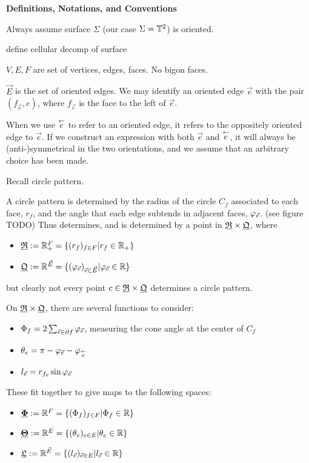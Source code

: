 \textbf{Definitions, Notations, and Conventions}

Always assume surface $\Sigma$ (our case $\Sigma = {\mathbb{T}^2}$) is oriented.

define cellular decomp of surface

$V,E,F$ are set of vertices, edges, faces.
No bigon faces.

$\vec{E}$ is the set of oriented edges.
We may identify an oriented edge $\vec{e}$ with the pair $(f_{\vec{e}}, e)$,
where $f_{\vec{e}}$ is the face to the left of $\vec{e}$.

When we use $\overset{\leftarrow}{e}$ to refer to an oriented edge, it refers to
the oppositely oriented edge to $\vec{e}$.
If we construct an expression with both $\vec{e}$ and $\overset{\leftarrow}{e}$,
it will always be (anti-)symmetrical in the two orientations,
and we assume that an arbitrary choice has been made.



Recall circle pattern.

A circle pattern is determined by the radius of the circle $C_f$ associated to each face, $r_f$,
and the angle that each edge subtends in adjacent faces, $\varphi_{\vec{e}}$. (see figure TODO)
Thus determines, and is determined by a point in ${\underline{\mathfrak{R}}} \times {\underline{\mathfrak{Q}}}$, where

\begin{itemize}
	\item ${\underline{\mathfrak{R}}} := \mathbb{R}_+^F = \{(r_f)_{f\in F} | r_f \in \mathbb{R}_+\}$
	\item ${\underline{\mathfrak{Q}}} := \mathbb{R}^{\vec{E}} =
		\{(\varphi_{\vec{e}})_{\vec{e} \in \vec{E}} | \varphi_{\vec{e}} \in \mathbb{R}\}$
\end{itemize}
but clearly not every point $c\in {\underline{\mathfrak{R}}} \times {\underline{\mathfrak{Q}}}$ determines a circle pattern.


On ${\underline{\mathfrak{R}}} \times {\underline{\mathfrak{Q}}}$, there are several functions to consider:
\begin{itemize}
	\item $\Phi_f = 2 \sum_{\vec{e} \in \partial f} \varphi_{\vec{e}}$, measuring the cone angle
		at the center of $C_f$
	\item $\theta_e = \pi - \varphi_{\vec{e}} - \varphi_{\overset{\leftarrow}{e}}$
	\item $l_{\vec{e}} = r_{f_{\vec{e}}} \sin \varphi_{\vec{e}}$
\end{itemize}

These fit together to give maps to the following spaces:

\begin{itemize}
	\item ${\underline{\mathbf{\Phi}}} := \mathbb{R}^F = \{(\Phi_f)_{f\in F} | \Phi_f \in \mathbb{R}\}$
	\item ${\underline{\mathbf{\Theta}}} := \mathbb{R}^E = \{(\theta_e)_{e \in E} | \theta_e \in \mathbb{R}\}$
	\item ${\underline{\mathfrak{L}}} := \mathbb{R}^{\vec{E}} = \{(l_{\vec{e}})_{\vec{e} \in E} | l_{\vec{e}} \in \mathbb{R}\}$
\end{itemize}


